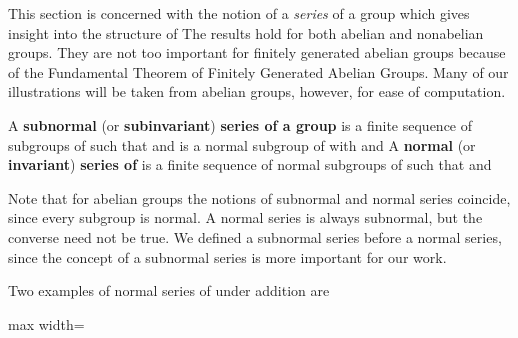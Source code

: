 \documentclass[11pt,oneside]{article}
\begin{document}
\fi
\renewcommand{\BookFooter}{Section 18 Series of Groups}
\ifdefined\BookMaster\else\setcounter{page}{157}\fi
\BookNarrativetrue

\begin{BookBody}



\noindent This section is concerned with the notion of a\textit{ series} of a group  which gives insight into the structure of  The results hold for both abelian and nonabelian groups. They are not too important for finitely generated abelian groups because of the Fundamental Theorem of Finitely Generated Abelian Groups. Many of our illustrations will be taken from abelian groups, however, for ease of computation.

 A\textbf{ subnormal} (or\textbf{ subinvariant})\textbf{ series of a group}  is a finite sequence  of subgroups of  such that  and  is a normal subgroup of  with  and  A\textbf{ normal} (or\textbf{ invariant})\textbf{ series of}  is a finite sequence  of normal subgroups of  such that  and  \BookEnd{\blacksquare}

Note that for abelian groups the notions of subnormal and normal series coincide, since every subgroup is normal. A normal series is always subnormal, but the converse need not be true. We defined a subnormal series before a normal series, since the concept of a subnormal series is more important for our work.

 Two examples of normal series of  under addition are

\begin{center}\begin{adjustbox}{max width=\linewidth}\end{adjustbox}\end{center}


\end{BookBody}
\end{document}
